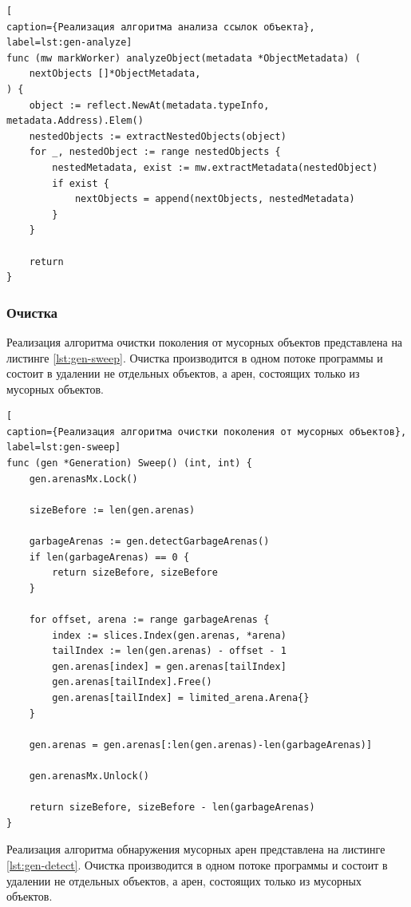 \begin{lstlisting}[
caption={Реализация алгоритма анализа ссылок объекта},
label=lst:gen-analyze]
func (mw markWorker) analyzeObject(metadata *ObjectMetadata) (
	nextObjects []*ObjectMetadata,
) {
	object := reflect.NewAt(metadata.typeInfo, metadata.Address).Elem()
	nestedObjects := extractNestedObjects(object)
	for _, nestedObject := range nestedObjects {
		nestedMetadata, exist := mw.extractMetadata(nestedObject)
		if exist {
			nextObjects = append(nextObjects, nestedMetadata)
		}
	}
	
	return
}
\end{lstlisting}



\subsubsection{Очистка}

Реализация алгоритма очистки поколения от мусорных объектов представлена на листинге \ref{lst:gen-sweep}. Очистка производится в одном потоке программы и состоит в удалении не отдельных объектов, а арен, состоящих только из мусорных объектов.

\begin{lstlisting}[
caption={Реализация алгоритма очистки поколения от мусорных объектов},
label=lst:gen-sweep]
func (gen *Generation) Sweep() (int, int) {
	gen.arenasMx.Lock()
	
	sizeBefore := len(gen.arenas)
	
	garbageArenas := gen.detectGarbageArenas()
	if len(garbageArenas) == 0 {
		return sizeBefore, sizeBefore
	}
	
	for offset, arena := range garbageArenas {
		index := slices.Index(gen.arenas, *arena)
		tailIndex := len(gen.arenas) - offset - 1
		gen.arenas[index] = gen.arenas[tailIndex]
		gen.arenas[tailIndex].Free()
		gen.arenas[tailIndex] = limited_arena.Arena{}
	}
	
	gen.arenas = gen.arenas[:len(gen.arenas)-len(garbageArenas)]
	
	gen.arenasMx.Unlock()
	
	return sizeBefore, sizeBefore - len(garbageArenas)
}
\end{lstlisting}

Реализация алгоритма обнаружения мусорных арен представлена на листинге \ref{lst:gen-detect}. Очистка производится в одном потоке программы и состоит в удалении не отдельных объектов, а арен, состоящих только из мусорных объектов.

